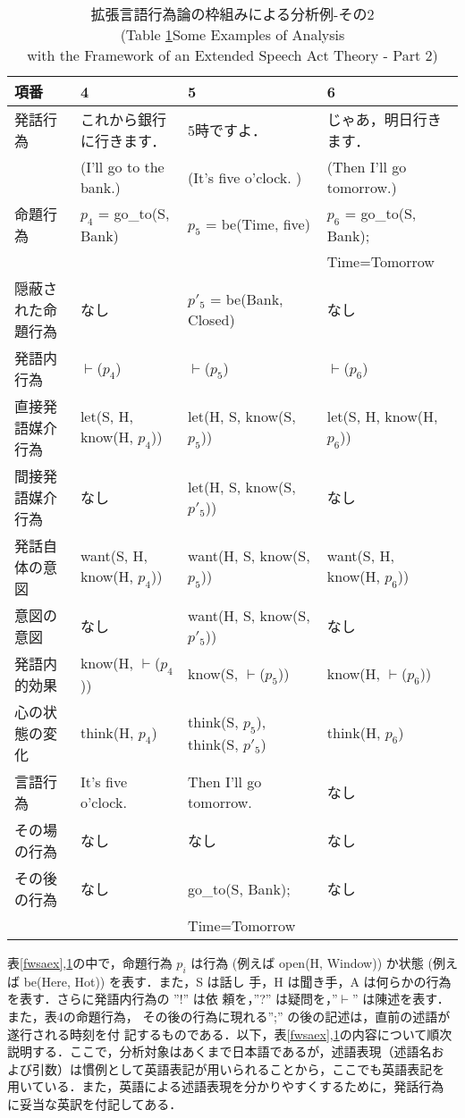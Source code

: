 \begin{table}[htbp]
\begin{center}
{\footnotesize
\begin{tabular}{l|l|l|l}
項番 & 4 & 5 & 6 \\  \hline
発話行為 & これから銀行に行きます． & 5時ですよ． & じゃあ，明日行きます．\\
& (I'll go to the bank.) & (It's five o'clock. ) & (Then I'll go tomorrow.)\\ \hline
命題行為 & $p_{4}$ = go\_to(S, Bank) & $p_{5}$ = be(Time, five) &
$p_{6}$ = go\_to(S, Bank); \\  
& & & Time=Tomorrow \\ \hline
隠蔽された命題行為 & なし & $p'_{5}$ = be(Bank, Closed)  & なし \\     \hline
発語内行為 & $\vdash$($p_{4}$) & $\vdash$($p_{5}$) & $\vdash$($p_{6}$) \\      \hline
直接発語媒介行為 & let(S, H, know(H, $p_{4}$)) & let(H, S, know(S, $p_{5}$)) & let(S, H, know(H, $p_{6}$)) \\	\hline
間接発語媒介行為 & なし & let(H, S, know(S, $p'_{5}$)) & なし\\      \hline
発話自体の意図 & want(S, H, know(H, $p_{4}$)) & want(H, S, know(S, $p_{5}$)) & want(S, H, know(H, $p_{6}$)) \\    \hline
意図の意図 & なし & want(H, S, know(S, $p'_{5}$)) & なし\\   \hline
発語内的効果 & know(H, $\vdash$($p_{4}$)) & know(S, $\vdash$($p_{5}$)) & know(H, $\vdash$($p_{6}$))\\  \hline
心の状態の変化 & think(H, $p_{4}$) & think(S, $p_{5}$), think(S, $p'_{5}$) & think(H, $p_{6}$)\\    \hline
言語行為 & It's five o'clock. & Then I'll go tomorrow. & なし \\        \hline
その場の行為 & なし & なし & なし\\    \hline
その後の行為 & なし & go\_to(S, Bank); & なし\\
& & Time=Tomorrow & \\
\end{tabular}
}
\caption{拡張言語行為論の枠組みによる分析例-その2\\
(Table \ref{fwsaex2}Some Examples of Analysis \\
with the Framework of an Extended Speech Act
Theory - Part 2)}
\label{fwsaex2}
\end{center}
\end{table}
表\ref{fwsaex},\ref{fwsaex2}の中で，命題行為 $p_{i}$ は行為 (例えば 
open(H, Window)) か状態 (例えば be(Here, Hot)) を表す．また，S は話し
手，H は聞き手，A は何らかの行為を表す．さらに発語内行為の ''!'' は依
頼を，''?'' は疑問を，''$\vdash$'' は陳述を表す．また，表4の命題行為，
その後の行為に現れる'';'' の後の記述は，直前の述語が遂行される時刻を付
記するものである．以下，表\ref{fwsaex},\ref{fwsaex2}の内容について順次
説明する．ここで，分析対象はあくまで日本語であるが，述語表現（述語名お
よび引数）は慣例として英語表記が用いられることから，ここでも英語表記を
用いている．また，英語による述語表現を分かりやすくするために，発話行為
に妥当な英訳を付記してある．


